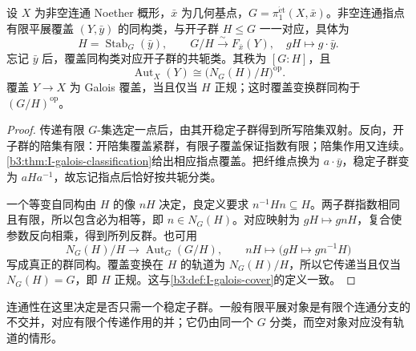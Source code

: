 \begin{corollary}\label{b3:cor:I-connected-subgroups}
	设 \(X\) 为非空连通 Noether 概形，\(\bar x\) 为几何基点，\(G=\pi_1^{\mathrm{\acute et}}(X,\bar x)\)。非空连通指点有限平展覆盖 \((Y,\bar y)\) 的同构类，与开子群 \(H\le G\) 一一对应，具体为
	\[
		H=\operatorname{Stab}_G(\bar y),\qquad
		G/H\xrightarrow{\sim}F_{\bar x}(Y),\quad gH\longmapsto g\cdot\bar y.
	\]
	忘记 \(\bar y\) 后，覆盖同构类对应开子群的共轭类。其秩为 \([G:H]\)，且
	\[
		\operatorname{Aut}_X(Y)\cong\bigl(N_G(H)/H\bigr)^{\mathrm{op}}.
	\]
	覆盖 \(Y\rightarrow X\) 为 Galois 覆盖，当且仅当 \(H\) 正规；这时覆盖变换群同构于 \((G/H)^{\mathrm{op}}\)。
\end{corollary}
\begin{proof}
	传递有限 \(G\)-集选定一点后，由其开稳定子群得到所写陪集双射。反向，开子群的陪集有限：开陪集覆盖紧群，有限子覆盖保证指数有限；陪集作用又连续。\cref{b3:thm:I-galois-classification}给出相应指点覆盖。把纤维点换为 \(a\cdot\bar y\)，稳定子群变为 \(aHa^{-1}\)，故忘记指点后恰好按共轭分类。

	一个等变自同构由 \(H\) 的像 \(nH\) 决定，良定义要求 \(n^{-1}Hn\subseteq H\)。两子群指数相同且有限，所以包含必为相等，即 \(n\in N_G(H)\)。对应映射为 \(gH\mapsto gnH\)，复合使参数反向相乘，得到所列反群。也可用
	\[
		N_G(H)/H\longrightarrow\operatorname{Aut}_G(G/H),
		\qquad nH\longmapsto\bigl(gH\longmapsto gn^{-1}H\bigr)
	\]
	写成真正的群同构。覆盖变换在 \(H\) 的轨道为 \(N_G(H)/H\)，所以它传递当且仅当 \(N_G(H)=G\)，即 \(H\) 正规。这与\cref{b3:def:I-galois-cover}的定义一致。
\end{proof}

连通性在这里决定是否只需一个稳定子群。一般有限平展对象是有限个连通分支的不交并，对应有限个传递作用的并；它仍由同一个 \(G\) 分类，而空对象对应没有轨道的情形。

